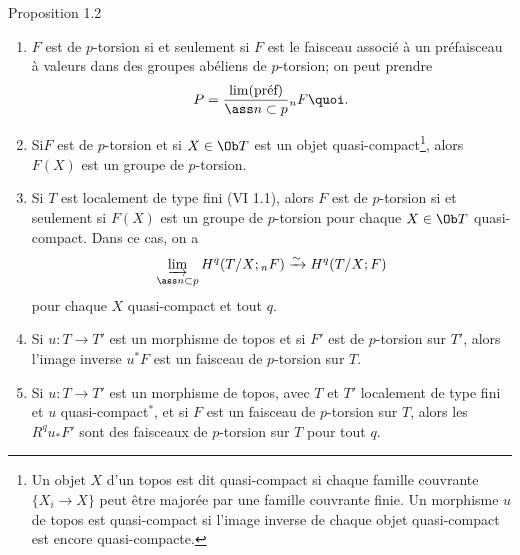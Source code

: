 \documentclass[10pt]{../fichiers-configuration-latex/smfart}
\begin{document}
\begin{enonce*}{Proposition 1.2}
\begin{enumerate}
\renewcommand{\theenumi}{\roman{enumi}}
\renewcommand{\labelenumi}{(\theenumi)}
\item $F$ est de $p$-torsion si et seulement si $F$ est le faisceau
  associé à un préfaisceau à valeurs dans des groupes abéliens de
  $p$-torsion; on peut prendre
$$
P=\frac{\lim(\text{\rm préf})}{\ass n\subset p} {}_nF{\quoi}.
$$

\item Si\pageoriginale $F$ est de $p$-torsion et si $X\in \Ob T$ est
  un objet quasi-compact\footnote[1]{Un objet $X$ d'un topos est dit
  quasi-compact si chaque famille couvrante $\{X_i\rightarrow X\}$
  peut être majorée par une famille couvrante finie. Un morphisme $u$
  de topos est quasi-compact si l'image inverse de chaque objet
  quasi-compact est encore quasi-compacte.}, alors $F(X)$ est un
  groupe de $p$-torsion.

\item Si $T$ est localement de type fini {\rm (VI 1.1)}, alors $F$ est
  de $p$-torsion si et seulement si $F(X)$ est un groupe de
  $p$-torsion pour chaque $X\in \Ob T$ quasi-compact. Dans ce cas, on
  a
$$
\varinjlim_{\ass n\subset p} H^q(T/X; {}_nF)\xrightarrow{\sim}
H^q(T/X;F)
$$
pour chaque $X$ quasi-compact et tout $q$.

\item Si $u:T\rightarrow T'$ est un morphisme de topos et si $F'$ est
  de $p$-torsion sur $T'$, alors l'image inverse $u^{\ast}F$ est un
  faisceau de $p$-torsion sur $T$.

\item Si $u:T\rightarrow T'$ est un morphisme de topos, avec $T$ et
  $T'$ localement de type fini et $u$ quasi-compact${}^\ast$, et si $F$ est un faisceau de $p$-torsion sur $T$, alors
  les $R^qu_{\ast}F'$ sont des faisceaux de $p$-torsion sur $T$ pour
  tout $q$.
\end{enumerate}
\end{enonce*}
\end{document}
